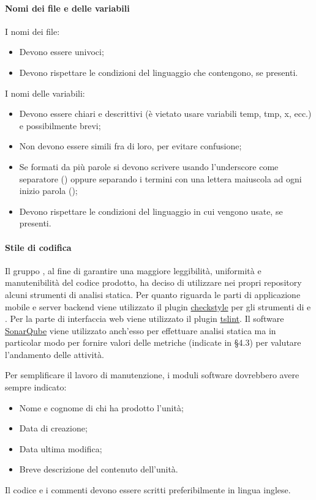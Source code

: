 \paragraph{Nomi dei file e delle variabili}\hbox{}
I nomi dei file:
\begin{itemize}
    \item Devono essere univoci;
    \item Devono rispettare le condizioni del linguaggio che contengono, se presenti.
\end{itemize}
I nomi delle variabili:
\begin{itemize}
    \item Devono essere chiari e descrittivi (è vietato usare variabili temp, tmp, x, ecc.) e possibilmente brevi;
    \item Non devono essere simili fra di loro, per evitare confusione;
    \item Se formati da più parole si devono scrivere usando l'underscore come separatore () oppure separando i termini con una lettera maiuscola ad ogni inizio parola ();
    \item Devono rispettare le condizioni del linguaggio in cui vengono usate, se presenti.
\end{itemize}

\paragraph{Stile di codifica}\hbox{}
Il gruppo \Gruppo{}, al fine di garantire una maggiore leggibilità, uniformità e manutenibilità del codice prodotto, ha deciso di utilizzare nei propri repository alcuni strumenti di analisi statica.
Per quanto riguarda le parti di applicazione mobile e server backend viene utilizzato il plugin \href{https://checkstyle.sourceforge.io}{checkstyle} per gli strumenti di   e .
Per la parte di interfaccia web viene utilizzato il plugin \textbf{} \href{https://palantir.github.io/tslint/}{tslint}.
Il software \href{https://www.sonarqube.org/}{SonarQube} viene utilizzato anch'esso per effettuare analisi statica ma in particolar modo per fornire valori delle metriche (indicate in §4.3) per valutare l'andamento delle attività.

Per semplificare il lavoro di manutenzione, i moduli software dovrebbero avere sempre indicato: 
\begin{itemize}
	\item Nome e cognome di chi ha prodotto l'unità;
	\item Data di creazione;
	\item Data ultima modifica;
	\item Breve descrizione del contenuto dell'unità.
\end{itemize} 

Il codice e i commenti devono essere scritti preferibilmente in lingua inglese.